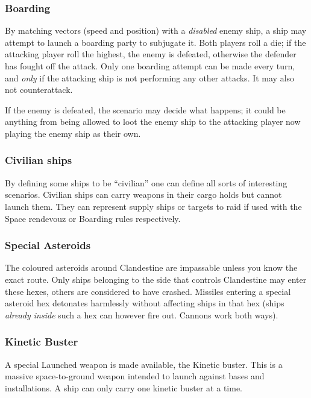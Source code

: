 \documentclass[a4paper,12pt,notitlepage,twocolumn]{article}
\begin{document}
\subsubsection*{Boarding}

By matching vectors (speed and position) with a \emph{disabled} enemy ship, a ship may
attempt to launch a boarding party to subjugate it. Both players roll
a die; if the attacking player roll the highest, the enemy is
defeated, otherwise the defender has fought off the attack. Only one
boarding attempt can be made every turn, and \emph{only} if the
attacking ship is not performing any other attacks. It may also not
counterattack. 

If the enemy is defeated, the scenario may decide what happens; it
could be anything from being allowed to loot the enemy ship to the
attacking player now playing the enemy ship as their own. 

\subsubsection*{Civilian ships}

By defining some ships to be ``civilian'' one can define all sorts of
interesting scenarios. Civilian ships can carry weapons in their cargo
holds but cannot launch them. They can represent supply
ships or targets to raid if used with the Space rendevouz or Boarding
rules respectively. 

\subsubsection*{Special Asteroids}

The coloured asteroids around Clandestine are impassable unless you
know the exact route. Only ships belonging to the side that controls
Clandestine may enter these hexes, others are considered to have
crashed. Missiles entering a special asteroid hex detonates harmlessly
without affecting ships in that hex (ships \emph{already inside} such a hex can
however fire out. Cannons work both ways). 

\subsubsection*{Kinetic Buster}

A special Launched weapon is made available, the Kinetic buster. This
is a massive space-to-ground weapon intended to launch against bases
and installations. A ship can only carry one kinetic buster at a time.
\end{document}
